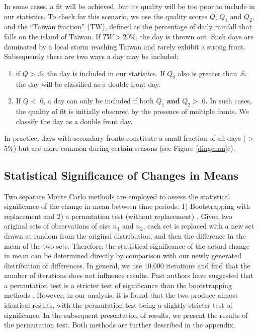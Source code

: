 \documentclass[draft,grl]{AGUTeX}
\begin{document}
\begin{article}
	
In some cases, a fit will be achieved, but its quality will be too poor to include in our statistics. To check for this scenario, we use the quality scores $Q$, $Q_1$ and $Q_2$, and the ``Taiwan fraction'' (TW), defined as the percentage of daily rainfall that falls on the island of Taiwan. If $TW > 20\%$, the day is thrown out. Such days are dominated by a local storm reaching Taiwan and rarely exhibit a strong front. Subsequently there are two ways a day may be included: 
	
\begin{enumerate}
	\item if $Q>.6$, the day is included in our statistics. If $Q_2$ also is greater than .6, the day will be classified as a double front day.
		
	\item If $Q<.6$, a day can only be included if both $Q_1 \mathrm{\textbf{ and }} Q_2 > .6$. In such cases, the quality of fit is initially obscured by the presence of multiple fronts. We classify the day as a double front day.
\end{enumerate}	
		
	In practice, days with secondary fronts constitute a small fraction of all days ($>$ 5\%) but are more common during certain seasons (see Figure \ref{dingchan}c).

\subsection{Statistical Significance of Changes in Means}

	Two separate Monte Carlo methods are employed to assess the statistical significance of the change in mean between time periods: 1) Bootstrapping with replacement and 2) a permutation test (without replacement) \citep{Good2005}. Given two original sets of observations of size $n_1$ and $n_2$, each set is replaced with a new set drawn at random from the original distribution, and then the difference in the mean of the two sets. Therefore, the statistical significance of the actual change in mean can be determined directly by comparison with our newly generated distribution of differences. In general, we use 10,000 iterations and find that the number of iterations does not influence results. Past authors have suggested that a permutation test is a stricter test of significance than the bootstrapping methods \citep{Hesterberg2003}. However, in our analysis, it is found that the two produce almost identical results, with the permutation test being a slightly stricter test of significance. In the subsequent presentation of results, we present the results of the permutation test. Both methods are further described in the appendix.


\end{article}
\end{document}
